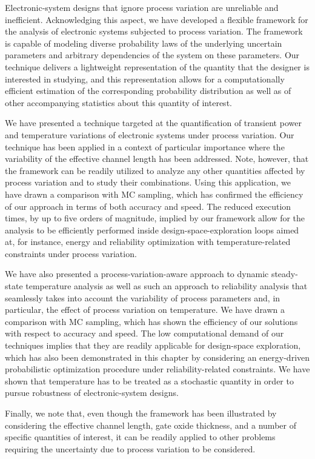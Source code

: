 Electronic-system designs that ignore process variation are unreliable and
inefficient. Acknowledging this aspect, we have developed a flexible framework
for the analysis of electronic systems subjected to process variation. The
framework is capable of modeling diverse probability laws of the underlying
uncertain parameters and arbitrary dependencies of the system on these
parameters. Our technique delivers a lightweight representation of the quantity
that the designer is interested in studying, and this representation allows for
a computationally efficient estimation of the corresponding probability
distribution as well as of other accompanying statistics about this quantity of
interest.

We have presented a technique targeted at the quantification of transient power
and temperature variations of electronic systems under process variation. Our
technique has been applied in a context of particular importance where the
variability of the effective channel length has been addressed. Note, however,
that the framework can be readily utilized to analyze any other quantities
affected by process variation and to study their combinations. Using this
application, we have drawn a comparison with \ac{MC} sampling, which has
confirmed the efficiency of our approach in terms of both accuracy and speed.
The reduced execution times, by up to five orders of magnitude, implied by our
framework allow for the analysis to be efficiently performed inside
design-space-exploration loops aimed at, for instance, energy and reliability
optimization with temperature-related constraints under process variation.

We have also presented a process-variation-aware approach to dynamic
steady-state temperature analysis as well as such an approach to reliability
analysis that seamlessly takes into account the variability of process
parameters and, in particular, the effect of process variation on temperature.
We have drawn a comparison with \ac{MC} sampling, which has shown the efficiency
of our solutions with respect to accuracy and speed. The low computational
demand of our techniques implies that they are readily applicable for
design-space exploration, which has also been demonstrated in this chapter by
considering an energy-driven probabilistic optimization procedure under
reliability-related constraints. We have shown that temperature has to be
treated as a stochastic quantity in order to pursue robustness of
electronic-system designs.

Finally, we note that, even though the framework has been illustrated by
considering the effective channel length, gate oxide thickness, and a number of
specific quantities of interest, it can be readily applied to other problems
requiring the uncertainty due to process variation to be considered.
